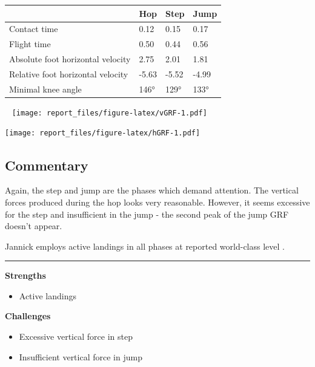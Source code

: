 \documentclass[]{scrreprt}
\providecommand{\tightlist}{%
  \setlength{\itemsep}{0pt}\setlength{\parskip}{0pt}}
\begin{document}
\begin{table}[H]
\centering
\begin{tabular}{l|l|l|l}
\hline
  & Hop & Step & Jump\\
\hline
Contact time & 0.12 & 0.15 & 0.17\\
\hline
Flight time & 0.50 & 0.44 & 0.56\\
\hline
Absolute foot horizontal velocity & 2.75 & 2.01 & 1.81\\
\hline
Relative foot horizontal velocity & -5.63 & -5.52 & -4.99\\
\hline
Minimal knee angle & 146° & 129° & 133°\\
\hline
\end{tabular}
\end{table}

~
\texttt{[image: report\_files/figure-latex/vGRF-1.pdf]}
~

\texttt{[image: report\_files/figure-latex/hGRF-1.pdf]}
~

\hypertarget{commentary-2}{%
\subsection{Commentary}\label{commentary-2}}

Again, the step and jump are the phases which demand attention. The vertical forces produced during the hop looks very reasonable. However, it seems excessive for the step and insufficient in the jump - the second peak of the jump GRF doesn't appear.

Jannick employs active landings in all phases at reported world-class level \autocite{Koh1990}.

\begin{center}\rule{0.5\linewidth}{0.5pt}\end{center}

\textbf{Strengths}

\begin{itemize}
\tightlist
\item
  Active landings
\end{itemize}

\textbf{Challenges}

\begin{itemize}
\tightlist
\item
  Excessive vertical force in step
\item
  Insufficient vertical force in jump
\end{itemize}

\clearpage
\end{document}
